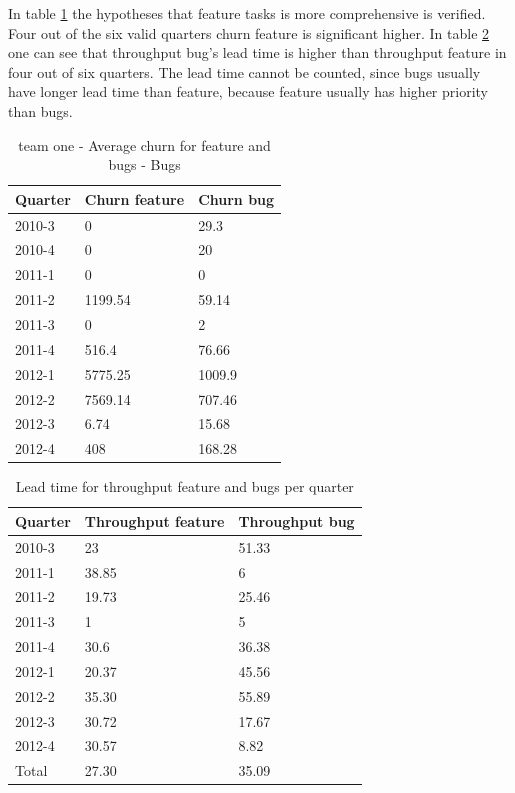 \documentclass[UKenglish]{ifimaster}  %
\begin{document}
In table \ref{cfb:1} the hypotheses that feature tasks is more comprehensive is verified.  Four out of the six valid quarters churn feature is significant higher.  In table \ref{lfb:1} one can see that throughput bug's lead time is higher than throughput feature in four out of six quarters. The lead time cannot be counted, since bugs usually have longer lead time than feature, because feature usually has higher priority than bugs.   
  
	


\begin{table}[!htbp] 
 \centering
\begin{tabular}{ | l | l | l | }
\hline
	Quarter & Churn feature & Churn bug \\ \hline
	2010-3 & 0 & 29.3 \\ \hline
	2010-4 & 0 & 20 \\ \hline
	2011-1 & 0 & 0 \\ \hline
	2011-2 & 1199.54 & 59.14 \\ \hline
	2011-3 & 0 & 2 \\ \hline
	2011-4 & 516.4 & 76.66 \\ \hline
	2012-1 & 5775.25 & 1009.9 \\ \hline
	2012-2 & 7569.14 & 707.46 \\ \hline
	2012-3 & 6.74 & 15.68 \\ \hline
	2012-4 & 408 & 168.28 \\ \hline
\end{tabular}
\caption{team one - Average churn for feature and bugs - Bugs }%
\label{cfb:1} %
\end{table}

\begin{table}[!htbp] 
 \centering
\begin{tabular}{ | l | l | l | }
\hline
	Quarter & Throughput feature & Throughput bug \\ \hline
	2010-3 & 23 & 51.33 \\ \hline
	2011-1 & 38.85 & 6 \\ \hline
	2011-2 & 19.73 & 25.46 \\ \hline
	2011-3 & 1 & 5 \\ \hline
	2011-4 & 30.6 & 36.38 \\ \hline
	2012-1 & 20.37 & 45.56 \\ \hline
	2012-2 & 35.30& 55.89 \\ \hline
	2012-3 & 30.72 & 17.67 \\ \hline
	2012-4 & 30.57& 8.82 \\ \hline
	Total & 27.30 & 35.09 \\ \hline
\end{tabular}
\caption{Lead time for throughput feature and bugs per quarter}
\label{lfb:1} %
\end{table}
\newpage 
\end{document}

